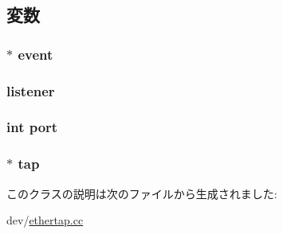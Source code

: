 \subsection{変数}
\hypertarget{classTapListener_a765488c8f26c7f8713d5245212dcae01}{
\subsubsection[{event}]{$\ast$ {\bf event}}}
\label{classTapListener_a765488c8f26c7f8713d5245212dcae01}
\hypertarget{classTapListener_acf9ea448b26a541b4a197f1ca92f700b}{
\subsubsection[{listener}]{ {\bf listener}}}
\label{classTapListener_acf9ea448b26a541b4a197f1ca92f700b}
\hypertarget{classTapListener_a63c89c04d1feae07ca35558055155ffb}{
\subsubsection[{port}]{\setlength{\rightskip}{0pt plus 5cm}int {\bf port}}}
\label{classTapListener_a63c89c04d1feae07ca35558055155ffb}
\hypertarget{classTapListener_afceac4e4f9153ef0f38b7c423422dd2e}{
\subsubsection[{tap}]{$\ast$ {\bf tap}}}
\label{classTapListener_afceac4e4f9153ef0f38b7c423422dd2e}


このクラスの説明は次のファイルから生成されました:\begin{DoxyCompactItemize}
\item 
dev/\hyperlink{ethertap_8cc}{ethertap.cc}\end{DoxyCompactItemize}
